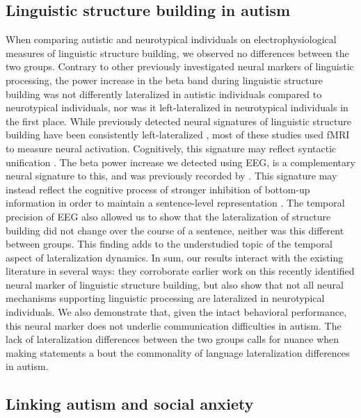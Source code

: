 \subsection*{Linguistic structure building in autism}

When comparing autistic and neurotypical individuals on electrophysiological measures of linguistic structure building, we observed no differences between the two groups. Contrary to other previously investigated neural markers of linguistic processing, the power increase in the beta band during linguistic structure building was not differently lateralized in autistic individuals compared to neurotypical individuals, nor was it left-lateralized in neurotypical individuals in the first place. While previously detected neural signatures of linguistic structure building have been consistently left-lateralized \citep{hagoort2017,giglio2022,fedorenko2010,friederici2003}, most of these studies used fMRI to measure neural activation. Cognitively, this signature may reflect syntactic unification \citep{hagoort2017}. The beta power increase we detected using EEG, is a complementary neural signature to this, and was previously recorded by \cite{bastiaansen2010,bastiaansen2015}. This signature may instead reflect the cognitive process of stronger inhibition of bottom-up information in order to maintain a sentence-level representation \citep{miller2018,lewis2016}. The temporal precision of EEG also allowed us to show that the lateralization of structure building did not change over the course of a sentence, neither was this different between groups. This finding adds to the understudied topic of the temporal aspect of lateralization dynamics. In sum, our results interact with the existing literature in several ways: they corroborate earlier work on this recently identified neural marker of linguistic structure building, but also show that not all neural mechanisms supporting linguistic processing are lateralized in neurotypical individuals. We also demonstrate that, given the intact behavioral performance, this neural marker does not underlie communication difficulties in autism. The lack of lateralization differences between the two groups calls for nuance when making statements a  bout the commonality of language lateralization differences in autism.

\subsection*{Linking autism and social anxiety}

